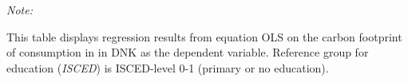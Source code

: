 \begin{table}[htbp!]
\begin{adjustbox}{width = 1\textwidth, max height = 0.95\textheight, center}
\begin{threeparttable}[b]
         \begin{tablenotes}\item \medskip \textit{Note:}
            \item This table displays regression results from equation OLS on the carbon footprint of consumption in  in DNK as the dependent variable.  Reference group for education (\textit{ISCED}) is ISCED-level 0-1 (primary or no education).
         \end{tablenotes}
      \end{threeparttable}
   \end{adjustbox}
\end{table}


